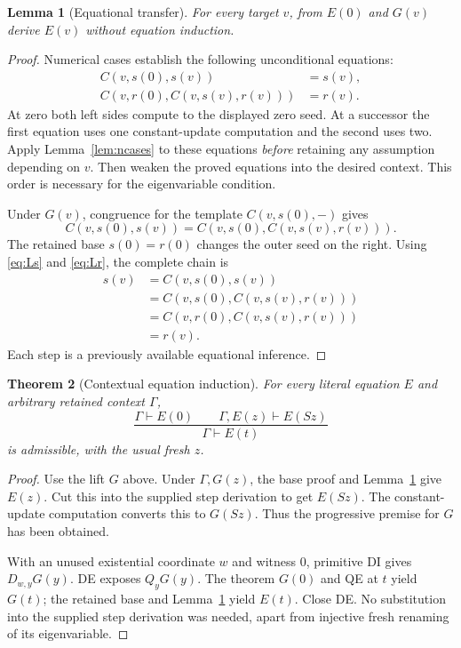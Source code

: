 \documentclass[11pt]{article}
\newtheorem{theorem}{Theorem}[section]
\newtheorem{lemma}[theorem]{Lemma}
\theoremstyle{definition}\newtheorem{definition}[theorem]{Definition}
\begin{document}
\begin{lemma}[Equational transfer]\label{lem:transfer}
For every target $v$, from $E(0)$ and $G(v)$ derive $E(v)$ without
equation induction.
\end{lemma}
\begin{proof}
Numerical cases establish the following unconditional equations:
\begin{align}
 C(v,s(0),s(v))&=s(v),                               \label{eq:Ls}\\
 C(v,r(0),C(v,s(v),r(v)))&=r(v).                     \label{eq:Lr}
\end{align}
At zero both left sides compute to the displayed zero seed. At a
successor the first equation uses one constant-update computation and
the second uses two. Apply Lemma~\ref{lem:ncases} to these equations
\emph{before} retaining any assumption depending on $v$. Then weaken
the proved equations into the desired context. This order is necessary
for the eigenvariable condition.

Under $G(v)$, congruence for the template $C(v,s(0),-)$ gives
\[
 C(v,s(0),s(v))=C(v,s(0),C(v,s(v),r(v))).
\]
The retained base $s(0)=r(0)$ changes the outer seed on the right.
Using \eqref{eq:Ls} and \eqref{eq:Lr}, the complete chain is
\begin{align*}
 s(v)
 &=C(v,s(0),s(v))\\
 &=C(v,s(0),C(v,s(v),r(v)))\\
 &=C(v,r(0),C(v,s(v),r(v)))\\
 &=r(v).
\end{align*}
Each step is a previously available equational inference.
\end{proof}

\begin{theorem}[Contextual equation induction]\label{thm:induction}
For every literal equation $E$ and arbitrary retained context $\Gamma$,
\[
 \frac{\Gamma\vdash E(0)\qquad\Gamma,E(z)\vdash E(Sz)}
      {\Gamma\vdash E(t)}
\]
is admissible, with the usual fresh $z$.
\end{theorem}
\begin{proof}
Use the lift $G$ above. Under $\Gamma,G(z)$, the base proof and
Lemma~\ref{lem:transfer} give $E(z)$. Cut this into the supplied step
derivation to get $E(Sz)$. The constant-update computation converts this
to $G(Sz)$. Thus the progressive premise for $G$ has been obtained.

With an unused existential coordinate $w$ and witness $0$, primitive
DI gives $D_{w,y}G(y)$. DE exposes $Q_yG(y)$. The theorem $G(0)$
and QE at $t$ yield $G(t)$; the retained base and
Lemma~\ref{lem:transfer} yield $E(t)$. Close DE. No substitution into
the supplied step derivation was needed, apart from injective fresh
renaming of its eigenvariable.
\end{proof}
\end{document}
